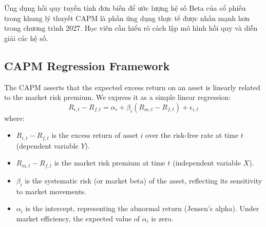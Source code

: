 \begin{examtip}[title={Cập nhật chương trình 2027}, colframe=red!75!black, colback=red!5!white]
Ứng dụng hồi quy tuyến tính đơn biến để ước lượng hệ số Beta của cổ phiếu trong khung lý thuyết CAPM là phần ứng dụng thực tế được nhấn mạnh hơn trong chương trình 2027. Học viên cần hiểu rõ cách lập mô hình hồi quy và diễn giải các hệ số.
\end{examtip}

\subsection{CAPM Regression Framework}
The CAPM asserts that the expected excess return on an asset is linearly related to the market risk premium. We express it as a simple linear regression:
\begin{equation}
	R_{i,t} - R_{f,t} = \alpha_i + \beta_i (R_{m,t} - R_{f,t}) + \epsilon_{i,t}
	\label{eq:capm_regression_m10}
\end{equation}
where:
\begin{itemize}
	\item $R_{i,t} - R_{f,t}$ is the excess return of asset $i$ over the risk-free rate at time $t$ (dependent variable $Y$).
	\item $R_{m,t} - R_{f,t}$ is the market risk premium at time $t$ (independent variable $X$).
	\item $\beta_i$ is the systematic risk (or market beta) of the asset, reflecting its sensitivity to market movements.
	\item $\alpha_i$ is the intercept, representing the abnormal return (Jensen's alpha). Under market efficiency, the expected value of $\alpha_i$ is zero.
\end{itemize}

